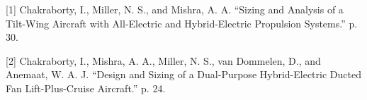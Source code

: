 [1] Chakraborty, I., Miller, N. S., and Mishra, A. A. “Sizing and Analysis of a Tilt-Wing Aircraft with All-Electric and Hybrid-Electric Propulsion Systems.” p. 30.

    [2] Chakraborty, I., Mishra, A. A., Miller, N. S., van Dommelen, D., and Anemaat, W. A. J. “Design and Sizing of a Dual-Purpose Hybrid-Electric Ducted Fan Lift-Plus-Cruise Aircraft.” p. 24.
